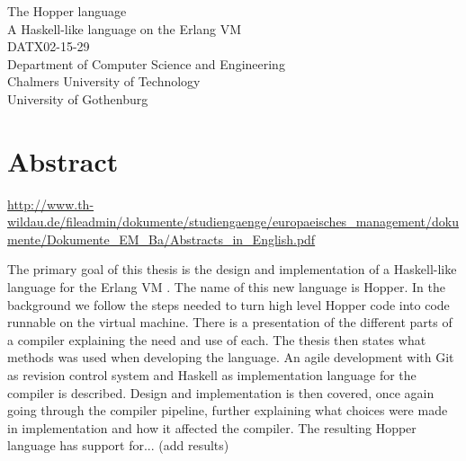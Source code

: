 The Hopper language\\
A Haskell-like language on the Erlang VM\\
DATX02-15-29\\
Department of Computer Science and Engineering\\
Chalmers University of Technology\\
University of Gothenburg\\

\thispagestyle{plain}			%
\section*{Abstract}



\url{http://www.th-wildau.de/fileadmin/dokumente/studiengaenge/europaeisches_management/dokumente/Dokumente_EM_Ba/Abstracts_in_English.pdf}







The primary goal of this thesis is the design and implementation of a Haskell-like language for the Erlang VM . The name of this new language is Hopper.
In the background we follow the steps needed to turn high level Hopper code into code runnable on the virtual machine. There is a presentation of the different parts of a compiler explaining the need and use of each. The thesis then states what methods was used when developing the language. An agile development with Git as revision control system and Haskell as implementation language for the compiler is described. Design and implementation is then covered, once again going through the compiler pipeline, further explaining what choices were made in implementation and how it affected the compiler.
The resulting Hopper language has support for... (add results)

